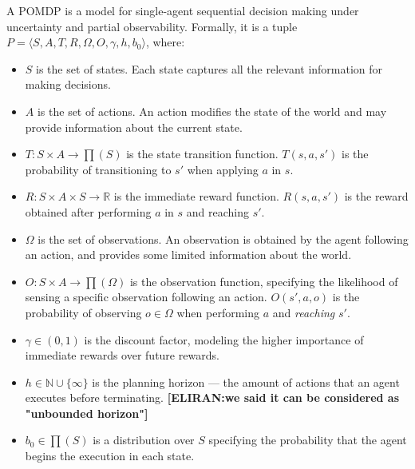 \documentclass[letterpaper]{article} %
\newcommand{\eliran}[1]{\textbf{[\color{red}ELIRAN:#1]}}
\newcommand{\ronen}[1]{\textbf{[\color{blue}RONEN:#1]}}
\begin{document}
A POMDP is a model for single-agent sequential decision making under uncertainty and partial observability.
Formally, it is a tuple $P=\langle S, A, T, R, \Omega, O, \gamma, h, b_0 \rangle$, where:
\begin{itemize}
\item
$S$ is the set of states. Each state captures all the relevant information for making decisions.
\item
$A$ is the set of actions. An action modifies the state of the world and may provide information about the current state.
\item
$T: S \times A \rightarrow \prod(S)$ is the state transition function.  $T(s, a, s')$ is the probability of transitioning to $s'$ when applying $a$ in $s$. 
\item
$R:S \times A \times S \rightarrow \mathbb{R}$  is the immediate reward function. $R(s,a, s')$ is the reward obtained after performing $a$ in $s$  and reaching $s'$. 
\item
$\Omega$ is the set of observations. An observation is obtained by the agent following an action, and provides some limited information about the world.
\item
$O:S \times A \rightarrow \prod (\Omega)$ is the observation function, specifying the likelihood of sensing a specific observation following an action. $O(s', a, o)$ is the probability of observing $o\in \Omega$ when performing $a$ and \emph{reaching} $s'$. 
\item
$\gamma \in (0,1)$ is the discount factor, modeling the higher importance of immediate rewards over future rewards.
\item
$h\in\mathbb{N}\cup\{\infty\}$ is the planning horizon --- the amount of actions that an agent executes before terminating. 
\eliran{we said it can be considered as "unbounded horizon"}

\item
$b_0\in \prod(S)$ is a distribution over $S$ specifying the probability that the agent begins the execution in each state.
\end{itemize}
\end{document}
